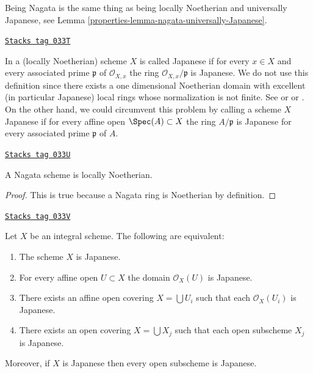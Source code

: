 Being Nagata is the same thing as being locally Noetherian
and universally Japanese, see
Lemma \ref{properties-lemma-nagata-universally-Japanese}.

\begin{remark}
\label{properties-remark-non-integral-Japanese}
\href{https://stacks.math.columbia.edu/tag/033T}{\texttt{Stacks tag 033T}}

In \cite{Hoobler-finite} a (locally Noetherian) scheme $X$ is called
Japanese if for every $x \in X$ and every associated prime $\mathfrak p$
of $\mathcal{O}_{X, x}$ the ring $\mathcal{O}_{X, x}/\mathfrak p$ is
Japanese. We do not use this definition since there exists a one
dimensional Noetherian domain with excellent (in particular
Japanese) local rings whose normalization is not finite. See
\cite[Example 1]{Hochster-loci} or \cite{Heinzer-Levy} or
\cite[Expos\'e XIX]{Traveaux}.
On the other hand, we could circumvent this problem by calling a scheme
$X$ Japanese if for every affine open $\Spec(A) \subset X$ the ring
$A/\mathfrak p$ is Japanese for every associated prime $\mathfrak p$ of $A$.
\end{remark}

\begin{lemma}
\label{properties-lemma-nagata-locally-Noetherian}
\href{https://stacks.math.columbia.edu/tag/033U}{\texttt{Stacks tag 033U}}

A Nagata scheme is locally Noetherian.
\end{lemma}

\begin{proof}
This is true because a Nagata ring is Noetherian by definition.
\end{proof}

\begin{lemma}
\label{properties-lemma-locally-Japanese}
\href{https://stacks.math.columbia.edu/tag/033V}{\texttt{Stacks tag 033V}}

Let $X$ be an integral scheme. The following are equivalent:
\begin{enumerate}
\item The scheme $X$ is Japanese.
\item For every affine open $U \subset X$ the domain $\mathcal{O}_X(U)$
is Japanese.
\item There exists an affine open covering $X = \bigcup U_i$
such that each $\mathcal{O}_X(U_i)$ is Japanese.
\item There exists an open covering $X = \bigcup X_j$
such that each open subscheme $X_j$ is Japanese.
\end{enumerate}
Moreover, if $X$ is Japanese then every open subscheme
is Japanese.
\end{lemma}

